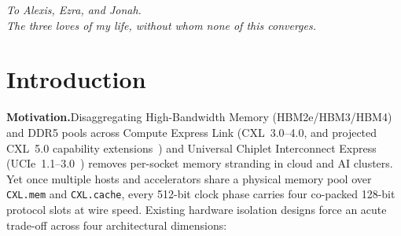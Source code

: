 \documentclass[11pt,letterpaper]{article}
\theoremstyle{spectralthm}
\begin{document}
\clearpage
\thispagestyle{empty}
\vspace*{0.28\textheight}
\begin{center}
\begin{minipage}{0.68\textwidth}
\centering\large\itshape
To Alexis, Ezra, and Jonah.\\[0.45em]
The three loves of my life, without whom none of this converges.
\end{minipage}
\end{center}
\vfill
\clearpage
\section{Introduction}
\label{sec:intro}

\noindent\textbf{Motivation.}\;Disaggregating High-Bandwidth Memory (HBM2e/HBM3/HBM4) and DDR5 pools across Compute Express Link (\mbox{CXL~3.0--4.0}, and projected \mbox{CXL~5.0} capability extensions~\cite{cxl2025spec, dassharma2024cxl, li2023pond, sun2023demystifying}) and Universal Chiplet Interconnect Express (\mbox{UCIe~1.1--3.0}~\cite{ucie2025spec30}) removes per-socket memory stranding in cloud and AI clusters. Yet once multiple hosts and accelerators share a physical memory pool over \texttt{CXL.mem} and \texttt{CXL.cache}, every 512-bit clock phase carries four co-packed 128-bit protocol slots at wire speed. Existing hardware isolation designs force an acute trade-off across four architectural dimensions:\par\smallskip
\end{document}
